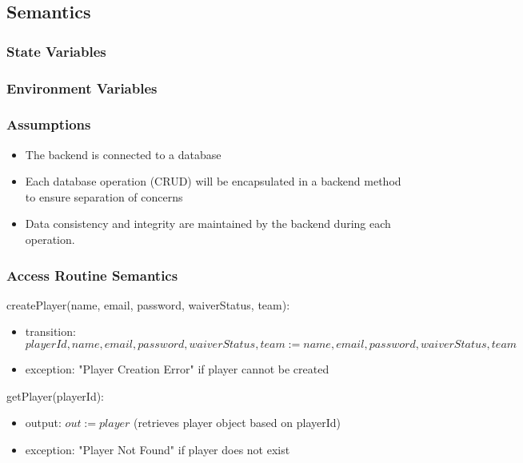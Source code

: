 \documentclass[12pt, titlepage]{article}
\begin{document}
\subsection{Semantics}

\subsubsection{State Variables}


\subsubsection{Environment Variables}


\subsubsection{Assumptions}

\begin{itemize}
  \item The backend is connected to a database
  \item Each database operation (CRUD) will be encapsulated in a backend method to ensure separation of concerns
  \item Data consistency and integrity are maintained by the backend during each operation.
\end{itemize}

\subsubsection{Access Routine Semantics}

\noindent createPlayer(name, email, password, waiverStatus, team):
\begin{itemize}
  \item transition: $playerId, name, email, password, waiverStatus, team := name, email, password, waiverStatus, team$
  \item exception: "Player Creation Error" if player cannot be created
\end{itemize}

\noindent getPlayer(playerId):
\begin{itemize}
  \item output: $out := player$ (retrieves player object based on playerId)
  \item exception: "Player Not Found" if player does not exist
\end{itemize}
\end{document}
